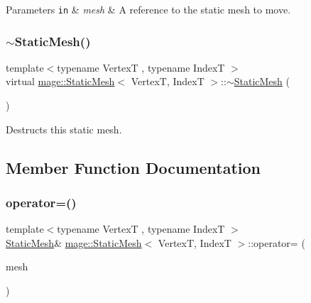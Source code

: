 \begin{DoxyParams}[1]{Parameters}
\mbox{\tt in}  & {\em mesh} & A reference to the static mesh to move. \\
\hline
\end{DoxyParams}
\hypertarget{classmage_1_1_static_mesh_ae14c69f2c93f534a4f48f66c8f2deb79}{}\label{classmage_1_1_static_mesh_ae14c69f2c93f534a4f48f66c8f2deb79} 
\subsubsection{\texorpdfstring{$\sim$\+Static\+Mesh()}{~StaticMesh()}}
{\footnotesize\ttfamily template$<$typename VertexT , typename IndexT $>$ \\
virtual \hyperlink{classmage_1_1_static_mesh}{mage\+::\+Static\+Mesh}$<$ VertexT, IndexT $>$\+::$\sim$\hyperlink{classmage_1_1_static_mesh}{Static\+Mesh} (\begin{DoxyParamCaption}{ }\end{DoxyParamCaption})\hspace{0.3cm}{\ttfamily [virtual]}}

Destructs this static mesh. 

\subsection{Member Function Documentation}
\hypertarget{classmage_1_1_static_mesh_a00919cc54283e85b94e3f3d97ebe2340}{}\label{classmage_1_1_static_mesh_a00919cc54283e85b94e3f3d97ebe2340} 
\subsubsection{\texorpdfstring{operator=()}{operator=()}\hspace{0.1cm}{\footnotesize\ttfamily [1/2]}}
{\footnotesize\ttfamily template$<$typename VertexT , typename IndexT $>$ \\
\hyperlink{classmage_1_1_static_mesh}{Static\+Mesh}\& \hyperlink{classmage_1_1_static_mesh}{mage\+::\+Static\+Mesh}$<$ VertexT, IndexT $>$\+::operator= (\begin{DoxyParamCaption}\item[{const \hyperlink{classmage_1_1_static_mesh}{Static\+Mesh}$<$ VertexT, IndexT $>$ \&}]{mesh }\end{DoxyParamCaption})\hspace{0.3cm}{\ttfamily [delete]}}

